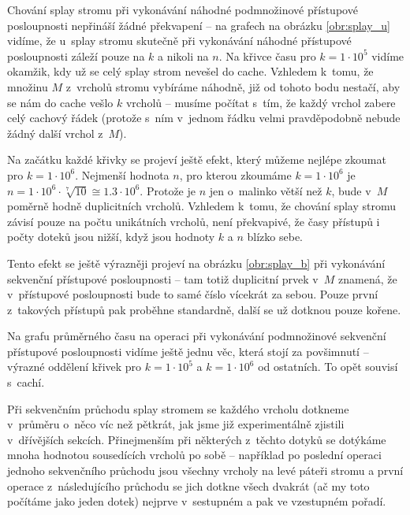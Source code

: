 Chování splay stromu při vykonávání náhodné podmnožinové přístupové
posloupnosti nepřináší žádné překvapení -- na grafech na obrázku \ref{obr:splay_u}
vidíme, že u~splay stromu skutečně při vykonávání náhodné přístupové
posloupnosti záleží pouze na $k$ a nikoli na $n$. Na křivce času pro $k =
1\cdot 10^5$ vidíme okamžik, kdy už se celý splay strom nevešel do cache.
Vzhledem k~tomu, že množinu $M$ z~vrcholů stromu vybíráme náhodně, již od
tohoto bodu nestačí, aby se nám do cache vešlo $k$ vrcholů -- musíme počítat
s~tím, že každý vrchol zabere celý cachový řádek (protože s~ním v~jednom řádku
velmi pravděpodobně nebude žádný další vrchol z~$M$).

Na začátku každé křivky se projeví ještě efekt, který můžeme nejlépe zkoumat
pro $k = 1\cdot 10^6$. Nejmenší hodnota $n$, pro kterou zkoumáme $k=1\cdot
10^6$ je $n= 1\cdot 10^6\cdot \sqrt[7]{10} \cong 1.3\cdot10^6$. Protože je $n$
jen o~malinko větší než $k$, bude v~$M$ poměrně hodně duplicitních vrcholů.
Vzhledem k~tomu, že chování splay stromu závisí pouze na počtu unikátních
vrcholů, není překvapivé, že časy přístupů i počty doteků jsou nižší, když jsou hodnoty $k$ a $n$ blízko sebe.

Tento efekt se ještě výrazněji projeví na obrázku \ref{obr:splay_b} při vykonávání sekvenční přístupové posloupnosti -- tam totiž duplicitní prvek v~$M$ znamená, že v~přístupové posloupnosti bude to samé číslo vícekrát za sebou. Pouze první z~takových přístupů pak proběhne standardně, další se už dotknou pouze kořene.

Na grafu průměrného času na operaci při vykonávání podmnožinové sekvenční
přístupové posloupnosti vidíme ještě jednu věc, která stojí za povšimnutí --
výrazné oddělení křivek pro $k=1\cdot 10^5$ a $k=1\cdot 10^6$ od ostatních. To opět souvisí s~cachí. 

Při sekvenčním průchodu splay stromem se každého vrcholu dotkneme v~průměru o~něco víc než pětkrát, jak jsme již experimentálně zjistili v~dřívějších sekcích. Přinejmenším při některých z~těchto dotyků se dotýkáme mnoha hodnotou sousedících vrcholů po sobě -- například po poslední operaci jednoho sekvenčního průchodu jsou všechny vrcholy na levé páteři stromu a první operace z~následujícího průchodu se jich dotkne všech dvakrát (ač my toto počítáme jako jeden dotek) nejprve v~sestupném a pak ve vzestupném pořadí. 

